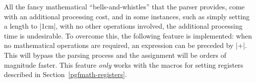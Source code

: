 All the fancy mathematical ``bells-and-whistles'' that the parser
provides, come with an additional processing cost, and in some
instances, such as simply setting a length to |1cm|, with no other
operations involved, the additional processing time is undesirable.
To overcome this, the following feature is implemented: when no
mathematical operations are required, an expression
can be preceded by |+|. This will bypass the parsing process and the
assignment will be orders of magnitude faster. This feature
\emph{only} works with the macros for setting registers described in
Section~\ref{pgfmath-registers}.

\begin{codeexample}
\pgfmathsetlength\mydimen{1cm}  %
\pgfmathsetlength\mydimen{+1cm} %
\end{codeexample}
